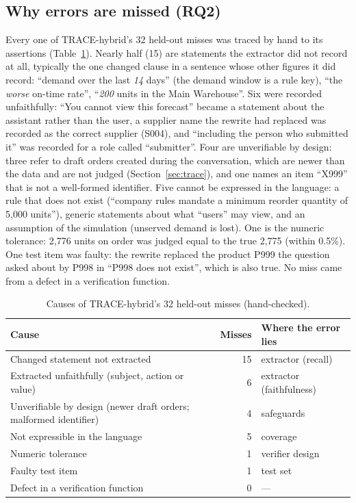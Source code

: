 \documentclass[journal]{IEEEtran}
\begin{document}
\subsection{Why errors are missed (RQ2)}
Every one of TRACE-hybrid's 32 held-out misses was traced by hand to its assertions
(Table~\ref{tab:misses}). Nearly half (15) are statements the extractor did not record at all, typically
the one changed clause in a sentence whose other figures it did record: ``demand over the last
\emph{14} days'' (the demand window is a rule key), ``the \emph{worse} on-time rate'', ``\emph{200} units in
the Main Warehouse''. Six were recorded unfaithfully: ``You cannot view this forecast'' became a statement
about the assistant rather than the user, a supplier name the rewrite had replaced was recorded as the
correct supplier (S004), and ``including the person who submitted it'' was recorded for a role called
``submitter''. Four are unverifiable by design: three refer to draft orders created during the
conversation, which are newer than the data and are not judged (Section~\ref{sec:trace}), and one names an
item ``X999'' that is not a well-formed identifier. Five cannot be expressed in the language: a rule that
does not exist (``company rules mandate a minimum reorder quantity of 5,000 units''), generic statements
about what ``users'' may view, and an assumption of the simulation (unserved demand is lost). One is the
numeric tolerance: 2,776 units on order was judged equal to the true 2,775 (within 0.5\%). One test item
was faulty: the rewrite replaced the product P999 the question asked about by P998 in ``P998 does not
exist'', which is also true. No miss came from a defect in a verification function.

\begin{table}[t]
\centering\footnotesize
\caption{Causes of TRACE-hybrid's 32 held-out misses (hand-checked).}
\label{tab:misses}
\setlength{\tabcolsep}{4pt}
\begin{tabular}{@{}>{\raggedright\arraybackslash}p{4.3cm}r>{\raggedright\arraybackslash}p{2.6cm}@{}}
\toprule
Cause & Misses & Where the error lies \\
\midrule
Changed statement not extracted & 15 & extractor (recall) \\
Extracted unfaithfully (subject, action or value) & 6 & extractor (faithfulness) \\
Unverifiable by design (newer draft orders; malformed identifier) & 4 & safeguards \\
Not expressible in the language & 5 & coverage \\
Numeric tolerance & 1 & verifier design \\
Faulty test item & 1 & test set \\
Defect in a verification function & 0 & --- \\
\bottomrule
\end{tabular}
\end{table}
\end{document}

